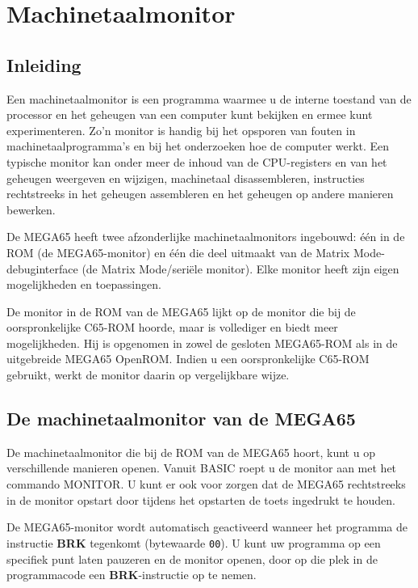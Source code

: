 \chapter{Machinetaalmonitor}
\label{cha:MLMonitor}
\section{Inleiding}

Een machinetaalmonitor is een programma waarmee u de interne toestand van de processor en het geheugen van een computer kunt bekijken en ermee kunt experimenteren. Zo'n monitor is handig bij het opsporen van fouten in machinetaalprogramma's en bij het onderzoeken hoe de computer werkt. Een typische monitor kan onder meer de inhoud van de CPU-registers en van het geheugen weergeven en wijzigen, machinetaal disassembleren, instructies rechtstreeks in het geheugen assembleren en het geheugen op andere manieren bewerken.

De MEGA65 heeft twee afzonderlijke machinetaalmonitors ingebouwd: één in de ROM (de MEGA65-monitor) en één die deel uitmaakt van de Matrix Mode-debuginterface (de Matrix Mode/seriële monitor). Elke monitor heeft zijn eigen mogelijkheden en toepassingen.

De monitor in de ROM van de MEGA65 lijkt op de monitor die bij de oorspronkelijke C65-ROM hoorde, maar is vollediger en biedt meer mogelijkheden. Hij is opgenomen in zowel de gesloten MEGA65-ROM als in de uitgebreide MEGA65 OpenROM. Indien u een oorspronkelijke C65-ROM gebruikt, werkt de monitor daarin op vergelijkbare wijze.


\section{De machinetaalmonitor van de MEGA65}

De machinetaalmonitor die bij de ROM van de MEGA65 hoort, kunt u op verschillende manieren openen. Vanuit BASIC roept u de monitor aan met het commando {\screentext MONITOR}. U kunt er ook voor zorgen dat de MEGA65 rechtstreeks in de monitor opstart door tijdens het opstarten de toets  ingedrukt te houden.

De MEGA65-monitor wordt automatisch geactiveerd wanneer het programma de instructie {\bf BRK} tegenkomt (bytewaarde {\tt 00}). U kunt uw programma op een specifiek punt laten pauzeren en de monitor openen, door op die plek in de programmacode een {\bf BRK}-instructie op te nemen.


